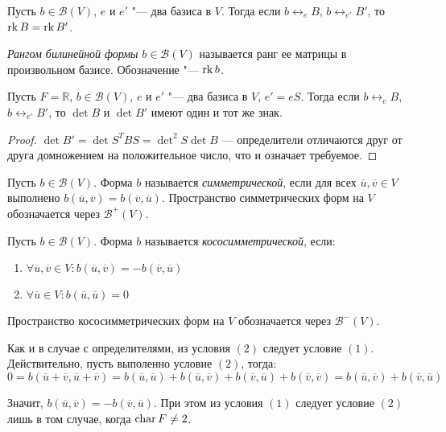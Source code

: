\begin{corollary}
		Пусть $b \in \mathcal{B}(V)$, $e$ и $e'$ "--- два базиса в $V$. Тогда если $b \leftrightarrow_e B$, $b \leftrightarrow_{e'} B'$, то $\operatorname{rk}{B} = \operatorname{rk}{B'}$.
\end{corollary}

\begin{definition}
	\textit{Рангом билинейной формы} $b \in \mathcal{B}(V)$ называется ранг ее матрицы в произвольном базисе. Обозначение "--- $\operatorname{rk}{b}$.
\end{definition}

\begin{corollary}
	Пусть $F = \mathbb{R}$, $b \in \mathcal{B}(V)$, $e$ и $e'$ "--- два базиса в $V$, $e' = eS$. Тогда если $b \leftrightarrow_e B$, $b \leftrightarrow_{e'} B'$, то $\det{B}$ и $\det{B'}$ имеют один и тот же знак.
\end{corollary}

\begin{proof}
	$\det{B'} = \det{S^TBS} = \det^2{S}\det{B}$ --- определители отличаются друг от друга домножением на положительное число, что и означает требуемое.
\end{proof}

\begin{definition}
	Пусть $b \in \mathcal{B}(V)$. Форма $b$ называется \textit{симметрической}, если для всех $\overline{u}, \overline{v} \in V$ выполнено $b(\overline{u}, \overline{v}) = b(\overline{v}, \overline{u})$. Пространство симметрических форм на $V$ обозначается через $\mathcal{B}^+(V)$.
\end{definition}

\begin{definition}
	Пусть $b \in \mathcal{B}(V)$. Форма $b$ называется \textit{кососимметрической}, если:
	\begin{enumerate}
		\item $\forall \overline{u}, \overline{v} \in V: b(\overline{u}, \overline{v}) = -b(\overline{v}, \overline{u})$
		\item $\forall \overline{u} \in V: b(\overline{u}, \overline{u}) = 0$
	\end{enumerate}
	
	Пространство кососимметрических форм на $V$ обозначается через $\mathcal{B}^-(V)$.
\end{definition}

\begin{note}
	Как и в случае с определителями, из условия $(2)$ следует условие $(1)$. Действительно, пусть выполенно условие $(2)$, тогда:
	\[0 = b(\overline{u} + \overline{v}, \overline{u} + \overline{v}) = b(\overline{u}, \overline{u}) + b(\overline{u}, \overline{v}) + b(\overline{v}, \overline{u}) + b(\overline{v}, \overline{v}) = b(\overline{u}, \overline{v}) + b(\overline{v}, \overline{u})\]
	
	Значит, $b(\overline{u}, \overline{v}) = -b(\overline{v}, \overline{u})$. При этом из условия $(1)$ следует условие $(2)$ лишь в том случае, когда $\operatorname{char}{F} \ne 2$.
\end{note}

